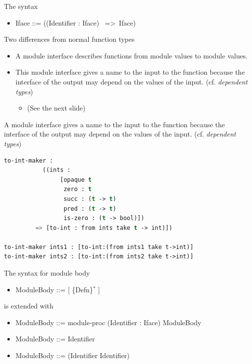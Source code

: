 \documentclass{article}
\begin{document}
\begin{huge}

The syntax
\begin{itemize}
\item
Iface ::= ((Identifier : Iface) \ =\textgreater \  Iface) \\
\end{itemize}

Two differences from normal function types
\begin{itemize}
\item A module interface describes functions from module values to
module values.
\item This module interface gives a name to the input to the function
because the interface of the output may depend on the values of the
input. (cf. {\it dependent types})
\begin{itemize}
\item (See the next slide)
\end{itemize}
\end{itemize}


A module interface gives a name to the input to the function
because the interface of the output may depend on the values of the
input. (cf. {\it dependent types})

\begin{lstlisting}[language=Lisp]
to-int-maker : 
           ((ints : 
                [opaque t
                 zero : t
                 succ : (t -> t)
                 pred : (t -> t)
                 is-zero : (t -> bool)])
         => [to-int : from ints take t -> int)])   

to-int-maker ints1 : [to-int:(from ints1 take t->int)]
to-int-maker ints2 : [to-int:(from ints2 take t->int)]
\end{lstlisting}


The syntax for module body
\begin{itemize}
\item ModuleBody ::= [ \{Defn\}$^*$ ] 
\end{itemize}
is extended with
\begin{itemize}
\item
ModuleBody ::= module-proc (Identifier : Iface) ModuleBody \\
\item
ModuleBody ::= Identifier \\
\item
ModuleBody ::= (Identifier Identifier) \\
\\
             

\end{itemize}
\end{huge}
\end{document}
